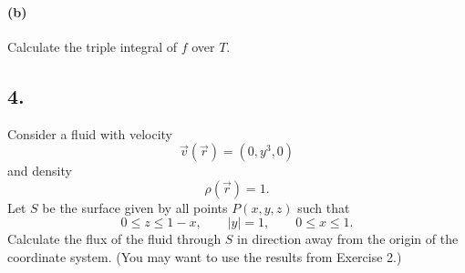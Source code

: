 \paragraph{(b)} Calculate the triple integral of $f$ over $T$.


\subsection*{4.} Consider a fluid with velocity
\[ 
\Vec{v} \left( \Vec{r} \right) = \left( 0,y^3, 0 \right) 
\]
and density
\[ 
\rho \left( \Vec{r} \right) = 1
.\]
Let $S$ be the surface given by all points $P(x,y,z)$ such that
\[ 
0 \leq z \leq 1 - x, \qquad \left| y \right| = 1, \qquad 0 \leq x \leq 1
.\]
Calculate the flux of the fluid through $S$ in direction away from the origin of the coordinate system. (You may want to use the results from Exercise 2.)
